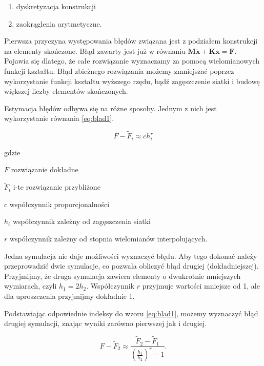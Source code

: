 \begin{enumerate}
	\item dyskretyzacja konstrukcji 
	\item zaokrąglenia arytmetyczne.
\end{enumerate}

\vspace{3mm}

Pierwsza przyczyna występowania błędów związana jest z podziałem konstrukcji na elementy skończone. Błąd zawarty jest już w równaniu \( \textbf{M} \ddot{\textbf{x}} + \textbf{Kx} = \textbf{F} \). Pojawia się dlatego, że całe rozwiązanie wyznaczamy za pomocą wielomianowych funkcji kształtu. Błąd zbieżnego rozwiązania możemy zmniejszać poprzez wykorzystanie funkcji kształtu wyższego rzędu, bądź zagęszczenie siatki i budowę większej liczby elementów skończonych.

Estymacja błędów odbywa się na różne sposoby. Jednym z nich jest wykorzystanie równania \ref{eq:blad1}. 

\begin{equation} \label{eq:blad1}
	F - \tilde{F}_i \approx ch_i^r
\end{equation}

gdzie
\begin{eqwhere}[2cm]
	\item[$ F $] rozwiązanie dokładne
	\item[$ \tilde{F}_i $] i-te rozwiązanie przybliżone
	\item[$ c $] współczynnik proporcjonalności
	\item[$ h_i $] współczynnik zależny od zagęszczenia siatki
	\item[$ r $] współczynnik zależny od stopnia wielomianów interpolujących.
\end{eqwhere}

Jedna symulacja nie daje możliwości wyznaczyć błędu. Aby tego dokonać należy przeprowadzić dwie symulacje, co pozwala obliczyć błąd drugiej (dokładniejszej). Przyjmijmy, że druga symulacja zawiera elementy o dwukrotnie mniejszych wymiarach, czyli \( h_1 = 2h_2 \). Współczynnik \( r \) przyjmuje wartości mniejsze od 1, ale dla uproszczenia przyjmijmy dokładnie 1.

Podstawiając odpowiednie indeksy do wzoru \ref{eq:blad1}, możemy wyznaczyć błąd drugiej symulacji, znając wyniki zarówno pierwszej jak i drugiej.

\begin{equation} 
	F- \tilde{F}_2 \approx \frac{\tilde{F}_2 - \tilde{F}_1}{(\frac{h_1}{h_2})^r - 1}.
\end{equation}

